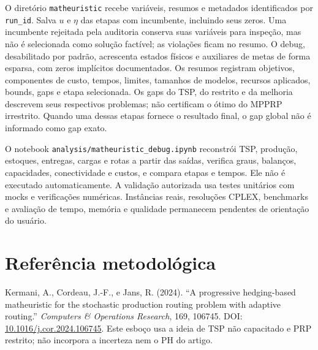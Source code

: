 \documentclass[11pt,a4paper]{article}
\begin{document}
O diretório \texttt{matheuristic} recebe variáveis, resumos e metadados identificados por \texttt{run\_id}. Salva $u$ e $\eta$ das etapas com incumbente, incluindo seus zeros. Uma incumbente rejeitada pela auditoria conserva suas variáveis para inspeção, mas não é selecionada como solução factível; as violações ficam no resumo. O debug, desabilitado por padrão, acrescenta estados físicos e auxiliares de metas de forma esparsa, com zeros implícitos documentados. Os resumos registram objetivos, componentes de custo, tempos, limites, tamanhos de modelos, recursos aplicados, bounds, gaps e etapa selecionada. Os gaps do TSP, do restrito e da melhoria descrevem seus respectivos problemas; não certificam o ótimo do MPPRP irrestrito. Quando uma dessas etapas fornece o resultado final, o gap global não é informado como gap exato.

O notebook \texttt{analysis/matheuristic\_debug.ipynb} reconstrói TSP, produção, estoques, entregas, cargas e rotas a partir das saídas, verifica graus, balanços, capacidades, conectividade e custos, e compara etapas e tempos. Ele não é executado automaticamente. A validação autorizada usa testes unitários com mocks e verificações numéricas. Instâncias reais, resoluções CPLEX, benchmarks e avaliação de tempo, memória e qualidade permanecem pendentes de orientação do usuário.

\section*{Referência metodológica}

Kermani, A., Cordeau, J.-F., e Jans, R. (2024). ``A progressive hedging-based matheuristic for the stochastic production routing problem with adaptive routing.'' \emph{Computers \& Operations Research}, 169, 106745. DOI: \href{https://doi.org/10.1016/j.cor.2024.106745}{10.1016/j.cor.2024.106745}. Este esboço usa a ideia de TSP não capacitado e PRP restrito; não incorpora a incerteza nem o PH do artigo.
\end{document}
